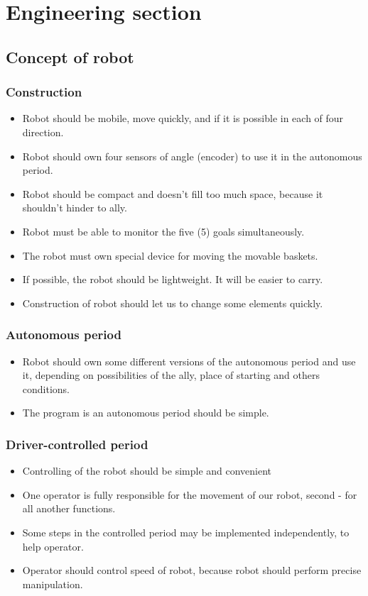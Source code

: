 \section{Engineering section}
\subsection{Concept of robot}
\subsubsection{Construction}
\begin{itemize}
	\item Robot should be mobile, move quickly, and if it is possible in each of four direction.
	\item Robot should own four sensors of angle (encoder) to use it in the autonomous period.
	\item Robot should be compact and doesn't fill too much space, because it shouldn't hinder to ally.
	\item Robot must be able to monitor the five (5) goals simultaneously. 
	\item The robot must own special device for moving the movable baskets.
	\item If possible, the robot should be lightweight. It will be easier to carry.
	\item Construction of robot should let us to change some elements quickly.
\end{itemize}
\subsubsection{Autonomous period}
\begin{itemize}
	\item Robot should own some different versions of the autonomous period and use it, depending on possibilities of the ally, place of starting and others conditions.
	\item The program is an autonomous period should be simple.
\end{itemize}
\subsubsection{Driver-controlled period}
\begin{itemize}
	\item Controlling of the robot should be simple and convenient
	\item One operator is fully responsible for the movement of our robot, second - for all another functions.
	\item Some steps in the controlled period may be  implemented independently, to help operator.
	\item Operator should control speed of robot, because robot should perform precise manipulation.
\end{itemize}
\fillpage

